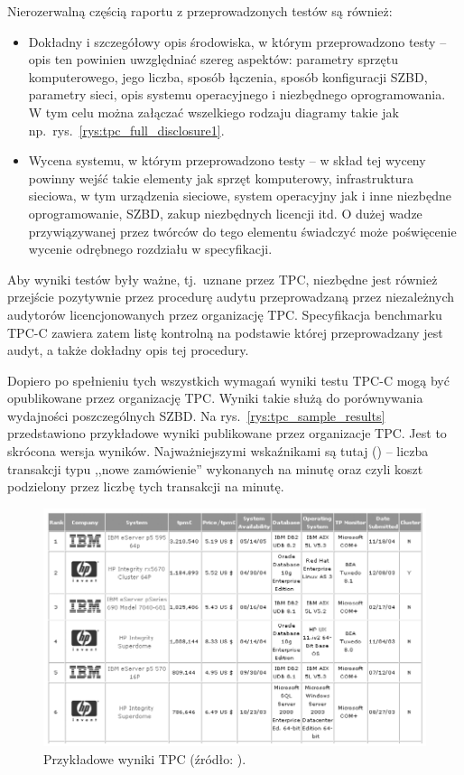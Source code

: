 Nierozerwalną częścią raportu z przeprowadzonych testów są również:
\begin{itemize}
\item Dokładny i szczegółowy opis środowiska, w którym przeprowadzono testy -- opis ten powinien uwzględniać szereg aspektów: 
parametry sprzętu komputerowego, jego liczba, sposób łączenia, sposób konfiguracji SZBD, parametry sieci, opis
systemu operacyjnego i niezbędnego oprogramowania. W tym celu można załączać wszelkiego rodzaju diagramy takie jak
np.~rys.~\vref{rys:tpc_full_disclosure1}.\afterpage{\clearpage}
\item Wycena systemu, w którym przeprowadzono testy -- w skład tej wyceny powinny wejść takie elementy jak sprzęt komputerowy, 
infrastruktura sieciowa, w tym urządzenia sieciowe, system operacyjny jak i inne niezbędne oprogramowanie, SZBD, 
zakup niezbędnych licencji itd. O dużej wadze przywiązywanej przez twórców do tego elementu
świadczyć może poświęcenie wycenie odrębnego rozdziału w specyfikacji.
\end{itemize}

Aby wyniki testów były ważne, tj.~uznane przez TPC, niezbędne jest również przejście pozytywnie
przez procedurę audytu przeprowadzaną przez niezależnych audytorów licencjonowanych
przez organizację TPC. Specyfikacja benchmarku TPC-C zawiera zatem listę kontrolną
na podstawie której przeprowadzany jest audyt, a także dokładny opis tej procedury.

Dopiero po spełnieniu tych wszystkich wymagań wyniki testu TPC-C mogą być opublikowane przez organizację TPC.
Wyniki takie służą do porównywania wydajności poszczególnych SZBD. Na rys.~\vref{rys:tpc_sample_results} 
przedstawiono przykładowe wyniki publikowane przez organizacje TPC. Jest to skrócona wersja wyników. 
Najważniejszymi wskaźnikami są tutaj  () 
-- liczba transakcji typu ,,nowe zamówienie'' wykonanych na minutę oraz  czyli 
koszt podzielony przez liczbę tych transakcji na minutę.

\begin{figure}[htp]
\begin{center}
\includegraphics[width=\linewidth]{figures/tpc/tpc_sample_results.png}
\end{center}
\caption{Przykładowe wyniki TPC (źródło: \cite{TPC1}).}\label{rys:tpc_sample_results}
\end{figure}

